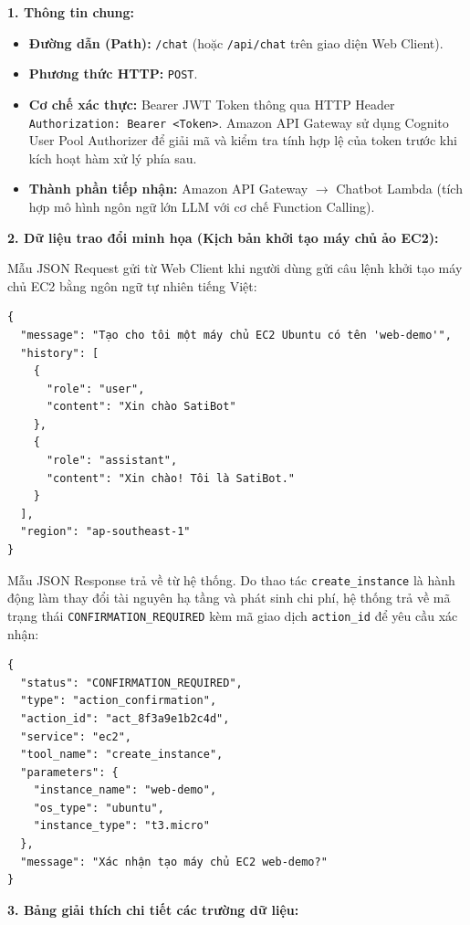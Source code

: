 \documentclass[a4paper,12pt]{article}
\begin{document}
\textbf{1. Thông tin chung:}
\begin{itemize}
    \item \textbf{Đường dẫn (Path):} \texttt{/chat} (hoặc \texttt{/api/chat} trên giao diện Web Client).
    \item \textbf{Phương thức HTTP:} \texttt{POST}.
    \item \textbf{Cơ chế xác thực:} Bearer JWT Token thông qua HTTP Header \texttt{Authorization: Bearer <Token>}. Amazon API Gateway sử dụng Cognito User Pool Authorizer để giải mã và kiểm tra tính hợp lệ của token trước khi kích hoạt hàm xử lý phía sau.
    \item \textbf{Thành phần tiếp nhận:} Amazon API Gateway $\rightarrow$ Chatbot Lambda (tích hợp mô hình ngôn ngữ lớn LLM với cơ chế Function Calling).
\end{itemize}

\textbf{2. Dữ liệu trao đổi minh họa (Kịch bản khởi tạo máy chủ ảo EC2):}

Mẫu JSON Request gửi từ Web Client khi người dùng gửi câu lệnh khởi tạo máy chủ EC2 bằng ngôn ngữ tự nhiên tiếng Việt:

\begin{verbatim}
{
  "message": "Tạo cho tôi một máy chủ EC2 Ubuntu có tên 'web-demo'",
  "history": [
    {
      "role": "user",
      "content": "Xin chào SatiBot"
    },
    {
      "role": "assistant",
      "content": "Xin chào! Tôi là SatiBot."
    }
  ],
  "region": "ap-southeast-1"
}
\end{verbatim}

Mẫu JSON Response trả về từ hệ thống. Do thao tác \texttt{create\_instance} là hành động làm thay đổi tài nguyên hạ tầng và phát sinh chi phí, hệ thống trả về mã trạng thái \texttt{CONFIRMATION\_REQUIRED} kèm mã giao dịch \texttt{action\_id} để yêu cầu xác nhận:

\begin{verbatim}
{
  "status": "CONFIRMATION_REQUIRED",
  "type": "action_confirmation",
  "action_id": "act_8f3a9e1b2c4d",
  "service": "ec2",
  "tool_name": "create_instance",
  "parameters": {
    "instance_name": "web-demo",
    "os_type": "ubuntu",
    "instance_type": "t3.micro"
  },
  "message": "Xác nhận tạo máy chủ EC2 web-demo?"
}
\end{verbatim}

\textbf{3. Bảng giải thích chi tiết các trường dữ liệu:}
\end{document}
